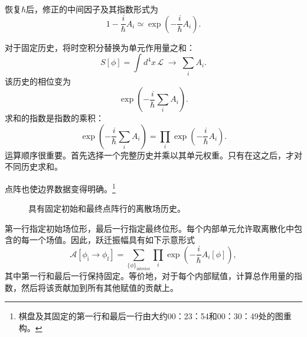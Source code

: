 \begin{classroomqa}
\end{classroomqa}

恢复\(\hbar\)后，修正的中间因子及其指数形式为
\begin{equation}
1-\frac{i}{\hbar}A_i
\simeq
\exp\!\left(-\frac{i}{\hbar}A_i\right).
\end{equation}

对于固定历史，将时空积分替换为单元作用量之和：
\begin{equation}
S[\phi]
=\int d^4x\,\mathcal{L}
\;\longrightarrow\;
\sum_i A_i.
\end{equation}
该历史的相位变为
\begin{equation}
\exp\!\left(-\frac{i}{\hbar}\sum_i A_i\right).
\end{equation}
求和的指数是指数的乘积：
\begin{equation}
\exp\!\left(-\frac{i}{\hbar}\sum_i A_i\right)
=
\prod_i\exp\!\left(-\frac{i}{\hbar}A_i\right).
\end{equation}
运算顺序很重要。首先选择一个完整历史并乘以其单元权重。只有在这之后，才对不同历史求和。

点阵也使边界数据变得明确。\footnote{棋盘及其固定的第一行和最后一行由大约00：23：54和00：30：49处的图重构。}
\begin{figure}[htbp]
\centering
{}
\caption{具有固定初始和最终点阵行的离散场历史。}
\end{figure}

第一行指定初始场位形，最后一行指定最终位形。每个内部单元允许取离散化中包含的每一个场值。因此，跃迁振幅具有如下示意形式
\begin{equation}
\mathcal{A}\!\left[\phi_{\mathrm{i}}\rightarrow\phi_{\mathrm{f}}\right]
=
\sum_{\{\phi\}_{\mathrm{interior}}}
\prod_i\exp\!\left(-\frac{i}{\hbar}A_i[\phi]\right),
\end{equation}
其中第一行和最后一行保持固定。等价地，对于每个内部赋值，计算总作用量的指数，然后将该贡献加到所有其他赋值的贡献上。

